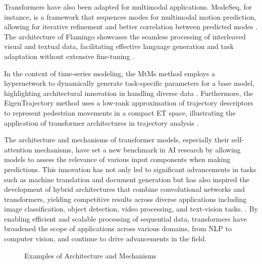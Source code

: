 Transformers have also been adapted for multimodal applications. ModeSeq, for instance, is a framework that sequences modes for multimodal motion prediction, allowing for iterative refinement and better correlation between predicted modes \cite{zhou2023leveragingtcntransformereffective}. The architecture of Flamingo showcases the seamless processing of interleaved visual and textual data, facilitating effective language generation and task adaptation without extensive fine-tuning \cite{alayrac2022flamingo}.



In the context of time-series modeling, the MtMs method employs a hypernetwork to dynamically generate task-specific parameters for a base model, highlighting architectural innovation in handling diverse data \cite{stank2024designingtimeseriesmodelshypernetworks}. Furthermore, the EigenTrajectory method uses a low-rank approximation of trajectory descriptors to represent pedestrian movements in a compact ET space, illustrating the application of transformer architectures in trajectory analysis \cite{bae2023eigentrajectorylowrankdescriptorsmultimodal}.



The architecture and mechanisms of transformer models, especially their self-attention mechanisms, have set a new benchmark in AI research by allowing models to assess the relevance of various input components when making predictions. This innovation has not only led to significant advancements in tasks such as machine translation and document generation but has also inspired the development of hybrid architectures that combine convolutional networks and transformers, yielding competitive results across diverse applications including image classification, object detection, video processing, and text-vision tasks. \cite{park2022attentionmechanismsphysiologicalsignal,timagetran4,kasneci2023chatgpt}. By enabling efficient and scalable processing of sequential data, transformers have broadened the scope of applications across various domains, from NLP to computer vision, and continue to drive advancements in the field.






{
\begin{figure}[ht!]
\centering
{}\hspace{0.03\textwidth}
\hspace{0.03\textwidth}
\hspace{0.03\textwidth}
\caption{Examples of Architecture and Mechanisms}\label{fig:retrieve_fig_1}
\end{figure}
}


